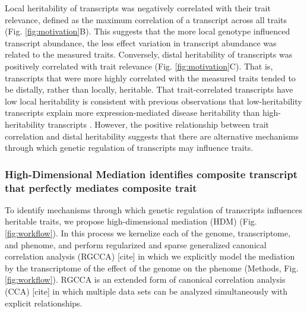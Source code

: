 \documentclass[
]{article}
\begin{document}
Local heritability of transcripts was negatively correlated with their
trait relevance, defined as the maximum correlation of a transcript
across all traits (Fig. \ref{fig:motivation}B). This suggests that the
more local genotype influenced transcript abundance, the less effect
variation in transcript abundance was related to the measured traits.
Conversely, distal heritability of transcripts was positively correlated
with trait relevance (Fig. \ref{fig:motivation}C). That is, transcripts
that were more highly correlated with the measured traits tended to be
distally, rather than locally, heritable. That trait-correlated
transcripts have low local heritability is consistent with previous
observations that low-heritability transcripts explain more
expression-mediated disease heritability than high-heritability
transcripts \cite{pmid32424349}. However, the positive relationship
between trait correlation and distal heritability suggests that there
are alternative mechanisms through which genetic regulation of
transcripts may influence traits.

\subsubsection{High-Dimensional Mediation identifies composite
transcript that perfectly mediates composite
trait}\label{high-dimensional-mediation-identifies-composite-transcript-that-perfectly-mediates-composite-trait}

To identify mechanisms through which genetic regulation of transcripts
influences heritable traits, we propose high-dimensional mediation (HDM)
(Fig. \ref{fig:workflow}). In this process we kernelize each of the
genome, transcriptome, and phenome, and perform regularized and sparse
generalized canonical correlation analysis (RGCCA) {[}cite{]} in which
we explicitly model the mediation by the transcriptome of the effect of
the genome on the phenome (Methods, Fig. \ref{fig:workflow}). RGCCA is
an extended form of canonical correlation analysis (CCA) {[}cite{]} in
which multiple data sets can be analyzed simultaneously with explicit
relationships.
\end{document}
